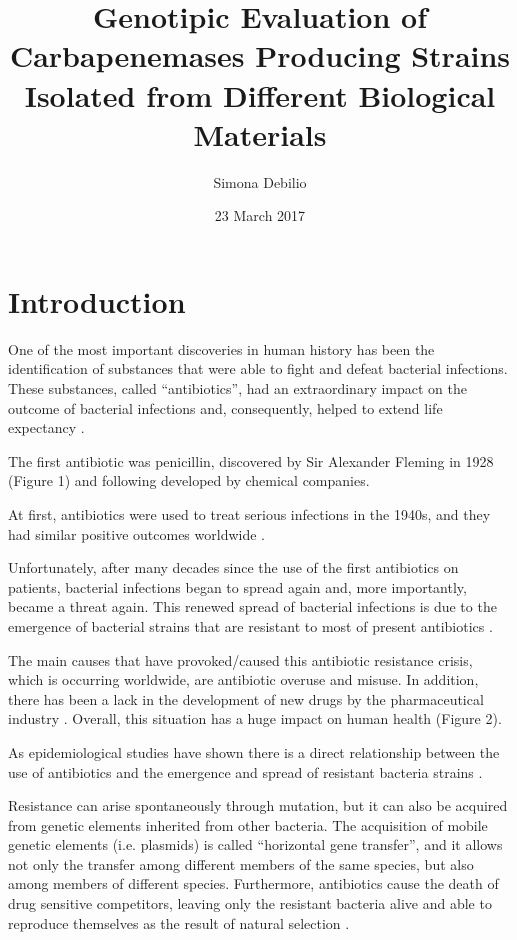 \documentclass[11pt]{report}
\title{\textbf{Genotipic Evaluation of Carbapenemases Producing Strains Isolated from Different Biological Materials}}
\author{Simona Debilio}
\date{23 March 2017}
\begin{document}
\maketitle

\tableofcontents

\chapter{Introduction}
One of the most important discoveries in human history has been the identification of substances that were able to fight and defeat bacterial infections.
These substances, called “antibiotics”, had an extraordinary impact on the outcome of bacterial infections and, consequently, helped to extend life expectancy \cite{ventola2015antibiotic}. 

The first antibiotic was penicillin, discovered by Sir Alexander Fleming in 1928 (Figure 1) and following developed by chemical companies.

At first, antibiotics were used to treat serious infections in the 1940s, and they had similar positive outcomes worldwide \cite{Spellberg2014}.

Unfortunately, after many decades since the use of the first antibiotics on patients, bacterial infections began to spread again and, more importantly, became a threat again.
This renewed spread of bacterial infections is due to the emergence of bacterial strains that are resistant to most of present antibiotics \cite{ventola2015antibiotic}.

The main causes that have provoked/caused this antibiotic resistance crisis, which is occurring worldwide, are antibiotic overuse and misuse. 
In addition, there has been a lack in the development of new drugs by the pharmaceutical industry \cite{nature2013}. 
Overall, this situation has a huge impact on human health (Figure 2).

As epidemiological studies have shown there is a direct relationship between the use of antibiotics and the emergence and spread of resistant bacteria strains \cite{huttner2013antimicrobial}.

Resistance can arise spontaneously through mutation, but it can also be acquired from genetic elements inherited from other bacteria. 
The acquisition of mobile genetic elements (i.e. plasmids) is called “horizontal gene transfer”, and it allows not only the transfer among different members of the same species, but also among members of different species.
Furthermore, antibiotics cause the death of drug sensitive competitors, leaving only the resistant bacteria alive and able to reproduce themselves as the result of natural selection \cite{doi:10.1093/emph/eou024}.
\end{document}

